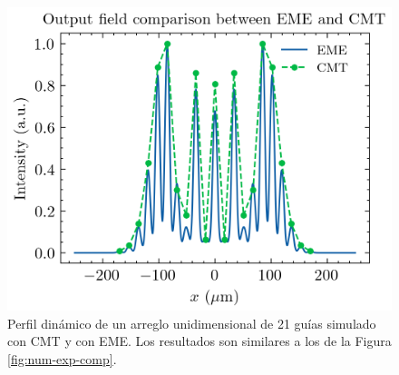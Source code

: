 \begin{figure}[h]
	\centering
	\includegraphics[width=0.65\linewidth]{codigo/1darraycmt/1darraycmt.png}
	\caption[Dinámica con EME y CMT.]{Perfil dinámico de un arreglo unidimensional de 21 guías simulado con CMT y con EME. Los resultados son similares a los de la Figura \ref{fig:num-exp-comp}.}
	\label{fig:1darraycmt}
\end{figure}

